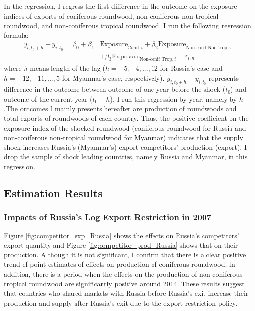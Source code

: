 \documentclass[a4paper,12pt]{article}
\begin{document}
In the regression, I regress the first difference in the outcome on the exposure indices of exports of coniferous roundwood, non-coniferous non-tropical roundwood, and non-coniferous tropical roundwood. I run the following regression formula:
\begin{align}
    y_{i, t_0 + h} - y_{i, t_0} = \beta_0 + \beta_1 &\text{Exposure}_{\text{Conif}, i} + \beta_2 \text{Exposure}_{\text{Non-conif Non-trop}, i} \nonumber \\
    &+ \beta_3 \text{Exposure}_{\text{Non-conif Trop}, i} + \varepsilon_{i, h}
\end{align}
where $h$ means length of the lag ($h = -5, -4, ..., 12$ for Russia's case and $h = -12, -11, ..., 5$ for Myanmar's case, respectively). $y_{i, t_0 + h} - y_{i, t_0}$ represents difference in the outcome between outcome of one year before the shock ($t_0$) and outcome of the current year ($t_0 + h$). I run this regression by year, namely by $h$.The outcomes I mainly presents hereafter are production of roundwoods and total exports of roundwoods of each country. Thus, the positive coefficient on the exposure index of the shocked roundwood (coniferous roundwood for Russia and non-coniferous non-tropical roundwood for Myanmar) indicates that the supply shock increases Russia's (Myanmar's) export competitors' production (export). I drop the sample of shock leading countries, namely Russia and Myanmar, in this regression.

\subsection{Estimation Results}
\subsubsection{Impacts of Russia's Log Export Restriction in 2007}
Figure \ref{fig:competitor_exp_Russia} shows the effects on Russia's competitors' export quantity and Figure \ref{fig:competitor_prod_Russia} shows that on their production. Although it is not significant, I confirm that there is a clear positive trend of point estimates of effects on production of coniferous roundwood. In addition, there is a period when the effects on the production of non-coniferous tropical roundwood are significantly positive around 2014. These results suggest that countries who shared markets with Russia before Russia's exit increase their production and supply after Russia's exit due to the export restriction policy.
\end{document}
